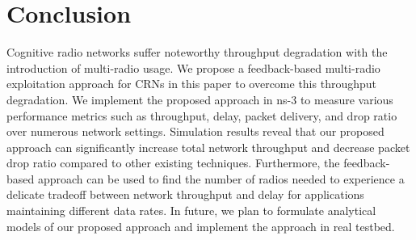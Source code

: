 \documentclass[letterpaper,conference]{IEEEtran}
\begin{document}
\section{Conclusion}
Cognitive radio networks suffer noteworthy throughput degradation with the introduction of multi-radio usage. We propose a feedback-based multi-radio exploitation approach for CRNs in this paper to overcome this throughput degradation. We implement the proposed approach in ns-3 to measure various performance metrics such as throughput, delay, packet delivery, and drop ratio over numerous network settings. Simulation results reveal that our proposed approach can significantly increase total network throughput and decrease packet drop ratio compared to other existing techniques. Furthermore, the feedback-based approach can be used to find the number of radios needed to experience a delicate tradeoff between network throughput and delay for applications maintaining different data rates. In future, we plan to formulate analytical models of our proposed approach and implement the approach in real testbed.

\footnotesize
 
\end{document}
